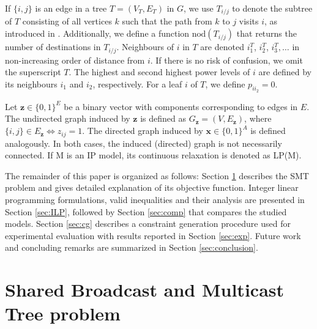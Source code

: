 If $\{i,j\}$ is an edge in a tree $T=(V_T,E_T)$ in $G$, we use $T_{i/j}$ to denote the subtree of $T$ consisting of all vertices $k$ such that the path from $k$ to $j$ visits $i$, as introduced in \cite{Haugland12Dual}. Additionally, we define a function $\text{nod}(T_{i/j})$ that returns the number of destinations in $T_{i/j}$. Neighbours of $i$ in $T$ are denoted $i^T_1$, $i^T_2$, $i^T_3, \dots$ in non-increasing order of distance from $i$. If there is no risk of confusion, we omit the superscript $T$. The highest and second highest power levels of $i$ are defined by its neighbours $i_1$ and $i_2$, respectively. For a leaf $i$ of $T$, we define $p_{ii_2}=0$.

Let $\mathbf{z} \in \{0,1\}^E$ be a binary vector with components corresponding to edges in $E$. The undirected graph induced by $\mathbf{z}$ is defined as  $G_\mathbf{z}=(V,E_\mathbf{z})$, where $\{i,j\}\in E_\mathbf{z}\Leftrightarrow z_{ij}=1$. The directed graph induced by $\mathbf{x} \in \{0,1\}^A$ is defined analogously. In both cases, the induced (directed) graph is not necessarily connected. If M is an IP model, its continuous relaxation is denoted as LP(M).

The remainder of this paper is organized as follows: Section \ref{sec:SBT} describes the SMT problem and gives detailed explanation of its objective function. Integer linear programming formulations, valid inequalities and their analysis are presented in Section \ref{sec:ILP}, followed by Section \ref{sec:comp} that compares the studied models. Section \ref{sec:cg} describes a constraint generation procedure used for experimental evaluation with results reported in Section \ref{sec:exp}. Future work and concluding remarks are summarized in Section \ref{sec:conclusion}.
\section{Shared Broadcast and Multicast Tree problem}
\label{sec:SBT}

